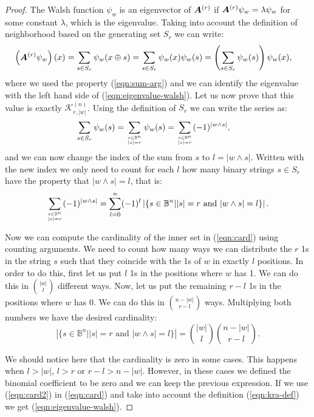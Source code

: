 \documentclass{article}
\def\vec#1{\mathchoice{\mbox{\boldmath$\displaystyle#1$}}
  {\mbox{\boldmath$\textstyle#1$}}
  {\mbox{\boldmath$\scriptstyle#1$}}
  {\mbox{\boldmath$\scriptscriptstyle#1$}}}
\newcommand{\comb}[2]{\binom{#1}{#2}}
\newcommand{\Bo}[0]{\mathbb{B}}
\newcommand{\krawel}[3]{\mathcal{K}^{#1}_{#2,#3}}
\begin{document}
\begin{proof}
The Walsh function $\psi_w$ is an eigenvector of $\vec{A}^{(r)}$ if $\vec{A}^{(r)} \psi_w = \lambda \psi_w$ for some constant $\lambda$, which is the eigenvalue. Taking into account the definition of neighborhood based on the generating set $S_r$ we can write:
\begin{align}
\left(\vec{A}^{(r)} \psi_w\right)(x) 
&= \sum_{s \in S_r} \psi_w (x\oplus s) 
= \sum_{s \in S_r} \psi_w(x) \psi_w (s) 
= \left( \sum_{s \in S_r} \psi_w(s) \right)\psi_w(x), \nonumber
\end{align}
where we used the property (\ref{eqn:sum-arg}) and we can identify the eigenvalue with the left hand side of (\ref{eqn:eigenvalue-walsh}). Let us now prove that this value is exactly $\krawel{(n)}{r}{|w|}$. Using the definition of $S_r$ we can write the series as:
\begin{align}
\sum_{s \in S_r} \psi_w(s) &= \sum_{s \in \Bo^n \atop |s|=r} \psi_w(s) = \sum_{s \in \Bo^n \atop |s|=r} (-1)^{|w \wedge s|},
\end{align}
and we can now change the index of the sum from $s$ to $l=|w \wedge s|$. Written with the new index we only need to count for each $l$ how many binary strings $s \in S_r$ have the property that $|w \wedge s|=l$, that is:
\begin{align}
\label{eqn:card}
\sum_{s \in \Bo^n \atop |s|=r} (-1)^{|w \wedge s|} = \sum_{l=0}^n (-1)^l \left| \{s \in \Bo^n| |s|=r \text{ and } |w \wedge s|=l\} \right|.
\end{align}

Now we can compute the cardinality of the inner set in (\ref{eqn:card}) using counting arguments. We need to count how many ways we can distribute the $r$ 1s in the string $s$ such that they coincide with the 1s of $w$ in exactly $l$ positions. In order to do this, first let us put $l$ 1s in the positions where $w$ has 1. We can do this in $\comb{|w|}{l} $ different ways. Now, let us put the remaining $r-l$ 1s in the positions where $w$ has 0. We can do this in $\comb{n-|w|}{r-l}$ ways. Multiplying both numbers we have the desired cardinality:
\begin{equation}
\label{eqn:card2}
\left| \{s \in \Bo^n| |s|=r \text{ and } |w \wedge s|=l\} \right| = \comb{|w|}{l} \comb{n-|w|}{r-l}.
\end{equation}

We should notice here that the cardinality is zero in some cases. This happens when $l > |w|$, $l>r$ or $r-l > n-|w|$. However, in these cases we defined the binomial coefficient to be zero and we can keep the previous expression. If we use (\ref{eqn:card2}) in (\ref{eqn:card}) and take into account the definition (\ref{eqn:kra-def}) we get (\ref{eqn:eigenvalue-walsh}).
\end{proof}
\end{document}
